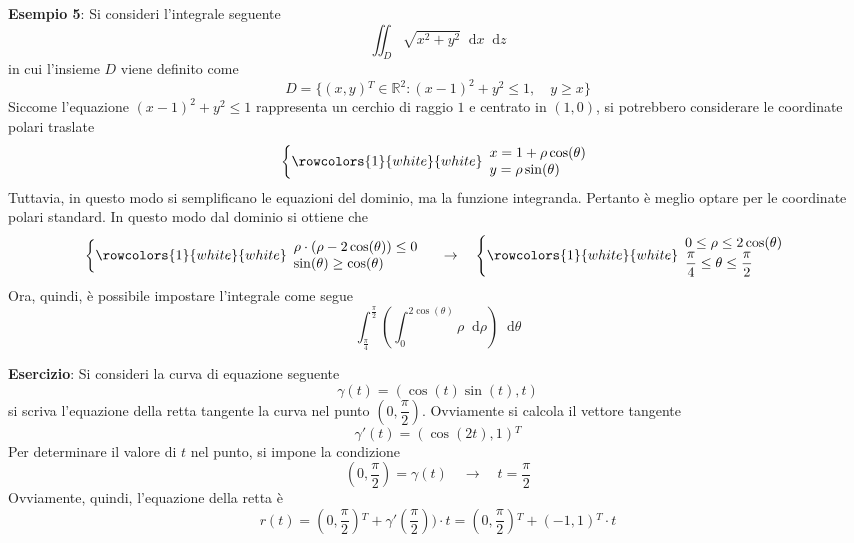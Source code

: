 \documentclass[a4paper]{extarticle}
\newcommand*\dif{\mathop{}\!\mathrm{d}}
\begin{document}
\vspace{2em}
\noindent
\textbf{Esempio 5}: Si consideri l'integrale seguente
\[\iint_D \sqrt{x^2+y^2} \dif x \dif z\]
in cui l'insieme $D$ viene definito come
\[D = \{(x,y){^T} \in \mathbb{R}^2 : (x-1)^2+y^2 \leq 1, \hspace{1em} y \geq x\}\]
Siccome l'equazione $(x-1)^2+y^2 \leq 1$ rappresenta un cerchio di raggio $1$ e centrato in $(1,0)$, si potrebbero considerare le coordinate polari traslate
\[
    \left\{
        \rowcolors{1}{white}{white}
        \begin{array}{l}
            x = 1 + \rho \cos(\theta)\\
            y = \rho \sin(\theta)
        \end{array}
    \right.
\]
Tuttavia, in questo modo si semplificano le equazioni del dominio, ma la funzione integranda. Pertanto è meglio optare per le coordinate polari standard. In questo modo dal dominio si ottiene che
\[
    \left\{
        \rowcolors{1}{white}{white}
        \begin{array}{l}
            \rho \cdot (\rho - 2 \cos(\theta)) \leq 0\\
            \sin(\theta) \geq \cos(\theta)
        \end{array}
    \right. \hspace{1em} \rightarrow \hspace{1em}
    \left\{
        \rowcolors{1}{white}{white}
        \begin{array}{l}
            0 \leq \rho \leq 2 \cos(\theta)\\
            \dfrac{\pi}{4} \leq \theta \leq \dfrac{\pi}{2}
        \end{array}
    \right.
\]
Ora, quindi, è possibile impostare l'integrale come segue
\[\int_{\frac{\pi}{4}}^{\frac{\pi}{2}} \left(\int_0^{2 \cos(\theta)} \rho \dif \rho\right) \dif \theta\]

\vspace{2em}
\noindent
\textbf{Esercizio}: Si consideri la curva di equazione seguente
\[\gamma (t) = \left(\cos(t) \sin(t), t\right)\]
si scriva l'equazione della retta tangente la curva nel punto $\left(0,\dfrac{\pi}{2}\right)$. Ovviamente si calcola il vettore tangente
\[\gamma'(t) = (\cos(2t),1){^T}\]
Per determinare il valore di $t$ nel punto, si impone la condizione
\[\left(0,\frac{\pi}{2}\right) = \gamma(t) \hspace{1em} \rightarrow \hspace{1em} t = \dfrac{\pi}{2}\]
Ovviamente, quindi, l'equazione della retta è
\[r(t) = \left(0,\dfrac{\pi}{2}\right){^T} + \gamma' \left(\dfrac{\pi}{2}\right)) \cdot t = \left(0,\dfrac{\pi}{2}\right){^T} + (-1,1){^T} \cdot t\]
\end{document}
